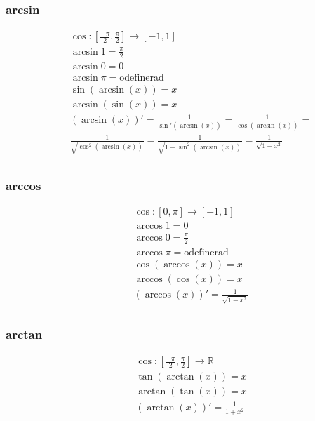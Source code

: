 \documentclass{article}
\begin{document}
\subsubsection{arcsin}
\begin{align*}
  &\quad  \cos: [\frac{-\pi}{2},\frac{\pi}{2}] \to [-1,1] \\
  &\quad  \arcsin{1}=\frac{\pi}{2} \\
  &\quad  \arcsin{0}=0 \\
  &\quad  \arcsin{\pi}=\text{odefinerad} \\
  &\quad  \sin(\arcsin(x))=x \\  
  &\quad  \arcsin(\sin(x))=x \\
  &\quad  (\arcsin(x))'=\frac{1}{\sin'(\arcsin(x))}=\frac{1}{\cos(\arcsin(x))}= \\
  &\quad  \frac{1}{\sqrt{\cos^2(\arcsin(x))}}=\frac{1}{\sqrt{1-\sin^2(\arcsin(x))}}=\frac{1}{\sqrt{1-x^2}} \\
\end{align*}

\subsubsection{arccos}
\begin{align*}
  &\quad  \cos: [0,\pi] \to [-1,1] \\
  &\quad  \arccos{1}=0 \\
  &\quad  \arccos{0}=\frac{\pi}{2} \\
  &\quad  \arccos{\pi}=\text{odefinerad} \\
  &\quad  \cos(\arccos(x))=x \\  
  &\quad  \arccos(\cos(x))=x \\
  &\quad  (\arccos(x))'= \frac{1}{\sqrt{1-x^2}} \\
\end{align*}

\subsubsection{arctan}
\begin{align*}
  &\quad  \cos: [\frac{-\pi}{2},\frac{\pi}{2}] \to \mathbb{R} \\
  &\quad  \tan(\arctan(x))=x \\  
  &\quad  \arctan(\tan(x))=x \\
  &\quad  (\arctan(x))'= \frac{1}{1+x^2} \\
\end{align*}
\end{document}
